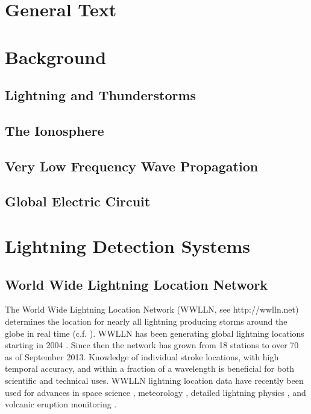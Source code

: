 \section{General Text}

\section{Background}

\subsection{Lightning and Thunderstorms}


\subsection{The Ionosphere}


\subsection{Very Low Frequency Wave Propagation}


\subsection{Global Electric Circuit}


\section{Lightning Detection Systems}


\subsection{World Wide Lightning Location Network}


The World Wide Lightning Location Network (WWLLN, see http://wwlln.net) determines the location for nearly all lightning producing storms around the globe in real time (c.f. \citet{Jacobson2006c}).
WWLLN has been generating global lightning locations starting in 2004 \citep{Rodger2006, Rodger2009}.
Since then the network has grown from 18 stations to over 70 as of September 2013.
Knowledge of individual stroke locations, with high temporal accuracy, and within a fraction of a wavelength is beneficial for both scientific and technical uses.
WWLLN lightning location data have recently been used for advances in space science \citep{Lay2007, Kumar2009, Collier2009, Holzworth2011, Jacobson2011}, meteorology \citep{Price2009,Thomas2010d}, detailed lightning physics \citep{Connaughton2010}, and volcanic eruption monitoring \citep{Doughton2010}.

